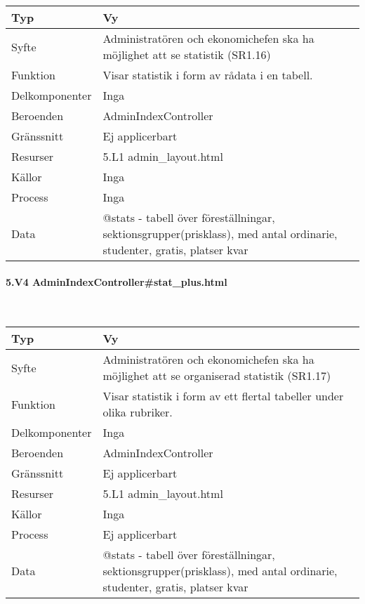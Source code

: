 \documentclass[a4paper, twoside, 11pt, titlepage]{article}
\begin{document}
			\begin {table} [ht] \begin{tabular} {  p{3.5cm} p{9.6cm} }
				\hline
				{Typ} & {Vy} \\
				\hline
				{Syfte} & {Administratören och ekonomichefen ska ha möjlighet att se statistik (SR1.16)} \\
				\hline
				{Funktion} & {Visar statistik i form av rådata i en tabell.} \\
				\hline
				{Delkomponenter} & {Inga} \\
				\hline
				{Beroenden} & {AdminIndexController} \\
				\hline
				{Gränssnitt} & {Ej applicerbart} \\
				\hline
				{Resurser} & {5.L1 admin\_layout.html} \\
				\hline
				{Källor} & {Inga} \\
				\hline
				{Process} & {Inga} \\
				\hline
				{Data} & {@stats - tabell över föreställningar, sektionsgrupper(prisklass), med antal ordinarie, studenter, gratis, platser kvar} \\
				\hline
			\end{tabular} \end{table} \FloatBarrier


			\paragraph{5.V4 AdminIndexController\#stat\_plus.html}\

			\begin {table} [ht] \begin{tabular} {  p{3.5cm} p{9.6cm} }
				\hline
				{Typ} & {Vy} \\
				\hline
				{Syfte} & {Administratören och ekonomichefen ska ha möjlighet att se organiserad statistik (SR1.17)} \\
				\hline
				{Funktion} & {Visar statistik i form av ett flertal tabeller under olika rubriker.} \\
				\hline
				{Delkomponenter} & {Inga} \\
				\hline
				{Beroenden} & {AdminIndexController} \\
				\hline
				{Gränssnitt} & {Ej applicerbart} \\
				\hline
				{Resurser} & {5.L1 admin\_layout.html} \\
				\hline
				{Källor} & {Inga} \\
				\hline
				{Process} & {Ej applicerbart} \\
				\hline
				{Data} & {@stats - tabell över föreställningar, sektionsgrupper(prisklass), med antal ordinarie, studenter, gratis, platser kvar} \\
				\hline
			\end{tabular} \end{table} \FloatBarrier
\end{document}
